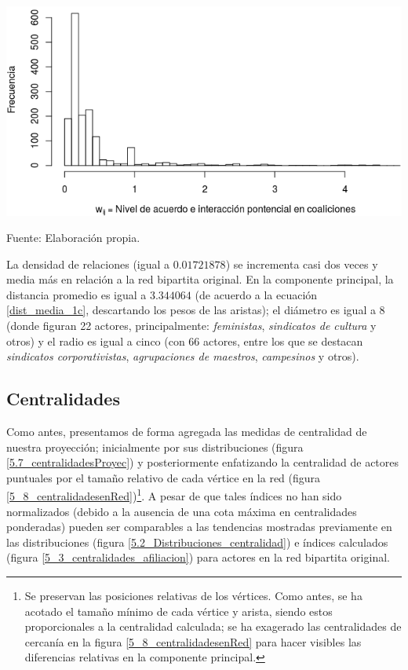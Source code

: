 \documentclass[letterpaper, 11pt]{book}
\theoremstyle{definition}
\theoremstyle{remark}
\begin{document}
\begin{minipage}{\linewidth}
\centering
{} \label{5.6_pesos}
\includegraphics[scale=0.72]{img/5.6_pesos.png}
\par\bigskip
\small Fuente: Elaboración propia. 
\end{minipage}\bigskip

La densidad de relaciones (igual a $0.01721878$) se incrementa casi dos veces y media más en relación a la red bipartita original. 
En la componente principal, la distancia promedio es igual a $3.344064$ (de acuerdo a la ecuación \ref{dist_media_1c}, descartando los pesos de las aristas); el diámetro es igual a 8 (donde figuran 22 actores, principalmente: \emph{feministas}, \emph{sindicatos de cultura} y otros) y el radio es igual a cinco (con 66 actores, entre los que se destacan \emph{sindicatos corporativistas}, \emph{agrupaciones de maestros}, \emph{campesinos} y otros). 





\subsection{Centralidades}
\label{subsec:cetralidades__proyec}


Como antes, presentamos de forma agregada las medidas de centralidad de nuestra proyección; inicialmente por sus distribuciones (figura \ref{5.7_centralidadesProyec}) y posteriormente enfatizando la centralidad de actores puntuales por el tamaño relativo de cada vértice en la red (figura \ref{5_8_centralidadesenRed})\footnote{
    Se preservan las posiciones relativas de los vértices. 
    Como antes, se ha acotado el tamaño mínimo de cada vértice y arista, siendo estos proporcionales a la centralidad calculada; se ha exagerado las centralidades de cercanía en la figura \ref{5_8_centralidadesenRed} para hacer visibles las diferencias relativas en la componente principal. 
}. 
A pesar de que tales índices no han sido normalizados (debido a la ausencia de una cota máxima en centralidades ponderadas) pueden ser comparables a las tendencias mostradas previamente en las distribuciones (figura \ref{5.2_Distribuciones_centralidad}) e índices calculados (figura \ref{5_3_centralidades_afiliacion}) para actores en la red bipartita original. 
\end{document}
